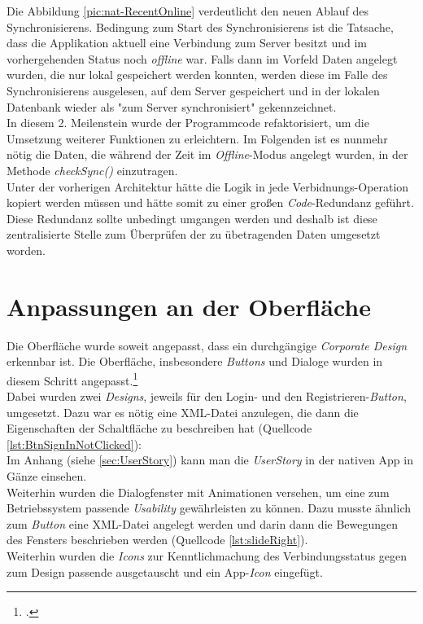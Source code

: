 Die Abbildung \ref{pic:nat-RecentOnline} verdeutlicht den neuen Ablauf des Synchronisierens. Bedingung zum Start des Synchronisierens ist die Tatsache, dass die Applikation aktuell eine Verbindung zum Server besitzt und im vorhergehenden Status noch \textit{offline} war. Falls dann im Vorfeld Daten angelegt wurden, die nur lokal gespeichert werden konnten, werden diese im Falle des Synchronisierens ausgelesen, auf dem Server gespeichert und in der lokalen Datenbank wieder als "zum Server synchronisiert" gekennzeichnet.\\
In diesem 2. Meilenstein wurde der Programmcode refaktorisiert, um die Umsetzung weiterer Funktionen zu erleichtern. Im Folgenden ist es nunmehr nötig die Daten, die während der Zeit im \textit{Offline}-Modus angelegt wurden, in der Methode \textit{checkSync()} einzutragen.\\
Unter der vorherigen Architektur hätte die Logik in jede Verbidnungs-Operation kopiert werden müssen und hätte somit zu einer großen \textit{Code}-Redundanz geführt. Diese Redundanz sollte unbedingt umgangen werden und deshalb ist diese zentralisierte Stelle zum Überprüfen der zu übetragenden Daten umgesetzt worden.

\section{Anpassungen an der Oberfläche}
\label{sec:anpassungen-oberflaeche}
Die Oberfläche wurde soweit angepasst, dass ein durchgängige \textit{Corporate Design} erkennbar ist. Die Oberfläche, insbesondere \textit{Buttons} und Dialoge wurden in diesem Schritt angepasst.\footcite{Android-Oberflaechen}\\
Dabei wurden zwei \textit{Designs}, jeweils für den Login- und den Registrieren-\textit{Button}, umgesetzt. Dazu war es nötig eine \ac{XML}-Datei anzulegen, die dann die Eigenschaften der Schaltfläche zu beschreiben hat (Quellcode \ref{lst:BtnSignInNotClicked}):
\\
Im Anhang (siehe \ref{sec:UserStory}) kann man die \textit{UserStory} in der nativen App in Gänze einsehen.\\ 
Weiterhin wurden die Dialogfenster mit Animationen versehen, um eine zum Betriebssystem passende \textit{Usability} gewährleisten zu können. Dazu musste ähnlich zum \textit{Button} eine \ac{XML}-Datei angelegt werden und darin dann die Bewegungen des Fensters beschrieben werden (Quellcode \ref{lst:slideRight}).
\\
Weiterhin wurden die \textit{Icons} zur Kenntlichmachung des Verbindungsstatus gegen zum Design passende ausgetauscht und ein App-\textit{Icon} eingefügt.

